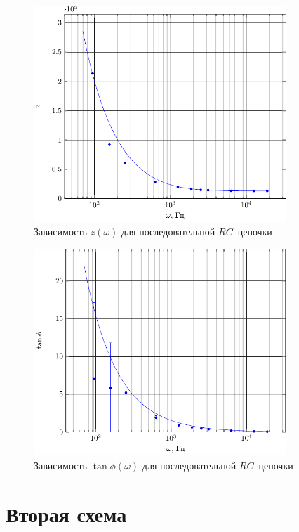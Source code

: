 \begin{figure}[H]
	\centering
	\includegraphics[width=0.85\textwidth]{img/chem1_z}
	\caption{Зависимость $z(\omega)$ для последовательной $RC$--цепочки}
	\label{fig:figure1}
\end{figure}
\begin{figure}[H]
	\centering
	\includegraphics[width=0.85\textwidth]{img/chem1_phi} 
	\caption{Зависимость $\tan\phi(\omega)$ для последовательной $RC$--цепочки}
	\label{fig:figure1}
\end{figure}
\section{Вторая схема}
\begin{center}

\end{center}

